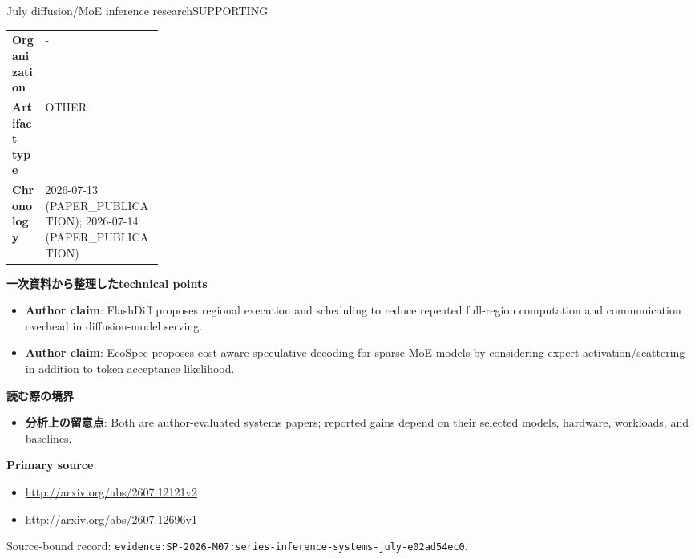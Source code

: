 \begin{technicalnote}{July diffusion/MoE inference research}{SUPPORTING}
\begin{tabularx}{\linewidth}{@{}>{\bfseries}p{0.22\linewidth}X@{}}
Organization & - \\
Artifact type & OTHER \\
Chronology & 2026-07-13 (PAPER\_PUBLICATION); 2026-07-14 (PAPER\_PUBLICATION) \\
\end{tabularx}
\smallskip
{\bfseries 一次資料から整理したtechnical points}
\begin{itemize}[leftmargin=1.5em,itemsep=0.35em]
\item \textbf{Author claim}: FlashDiff proposes regional execution and scheduling to reduce repeated full-region computation and communication overhead in diffusion-model serving.
\item \textbf{Author claim}: EcoSpec proposes cost-aware speculative decoding for sparse MoE models by considering expert activation/scattering in addition to token acceptance likelihood.
\end{itemize}
{\bfseries 読む際の境界}
\begin{itemize}[leftmargin=1.5em,itemsep=0.35em]
\item \textbf{分析上の留意点}: Both are author-evaluated systems papers; reported gains depend on their selected models, hardware, workloads, and baselines.
\end{itemize}
{\bfseries Primary source}
\begingroup\sloppy
\begin{itemize}[leftmargin=1.5em,itemsep=0.25em]
\item {\scriptsize\url{http://arxiv.org/abs/2607.12121v2}}
\item {\scriptsize\url{http://arxiv.org/abs/2607.12696v1}}
\end{itemize}
\endgroup
{\scriptsize\color{SurveyMuted}Source-bound record: \texttt{evidence:SP-2026-M07:series-inference-systems-july-e02ad54ec0}.}
\end{technicalnote}
\medskip
